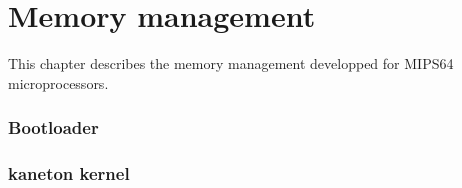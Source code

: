 %
%
%
%
%
%

%
%

\chapter{Memory management}

This chapter describes the memory management developped for MIPS64 microprocessors.

\subsection{Bootloader}

\subsection{kaneton kernel}
